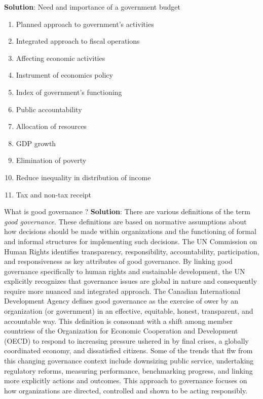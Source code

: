 \documentclass[
]{book}
\newcommand{\question}{\item}
\newenvironment{solution}{ {\bfseries Solution}:}{}
\begin{document}
\begin{questions}
\begin{solution}
Need and importance of a government budget
\begin{enumerate}
\item Planned approach to government's activities
\item Integrated approach to fiscal operations
\item Affecting economic activities
\item Instrument of economics policy
\item Index of government's functioning
\item Public accountability
\item Allocation of resources
\item GDP growth
\item Elimination of poverty
\item Reduce inequality in distribution of income
\item Tax and non-tax receipt
\end{enumerate}

\end{solution}

\question What is good governance ?
\begin{solution}
There are various definitions of the term \textit{good governance}. These definitions are based on normative assumptions about how decisions should be made within organizations and the functioning of formal and informal structures for implementing such decisions. The UN Commission on Human Rights identifies transparency, responsibility, accountability, participation, and responsiveness as key attributes of good governance. By linking good governance specifically to human rights and sustainable development, the UN explicitly recognizes that governance issues are global in nature and consequently require more nuanced and integrated approach. The Canadian International Development Agency defines good governance as the exercise of ower by an organization (or government) in an effective, equitable, honest, transparent, and accountable way. This definition is consonant with a shift among member countriess of the Organization for Economic Cooperation and Development (OECD) to respond to increasing pressure ushered in by final crises, a globally coordinated economy, and dissatisfied citizens. Some of the trends that flw from this changing governance context include downsizing public service, undertaking regulatory reforms, measuring performance, benchmarking progress, and linking more explicitly actions and outcomes. This approach to governance focuses on how organizations are directed, controlled and shown to be acting responsibly.


\end{solution}
\end{questions}
\end{document}
